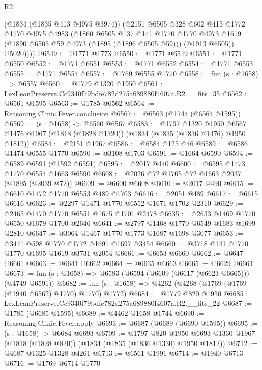 \begin{lexlean}{R2}
\begin{coremodule}
          (@1834 (@1835 @413 @4975 @3974))
          (@2151
            @6505
            @328
            @602
            @415
            @1772
            @1770
            @4975
            @4983
            (@1860
              @6505
              @137
              @141
              @1770
              @1770
              @4973
              @1619
              (@1890 @6505 @59 @4973 (@1895 (@1896 @6505 @59)))
              (@1913 @6505))
            @5020))))
@6549 := @1771 @1773
@6550 := @1771 @6549
@6551 := @1771 @6550
@6552 := @1771 @6551
@6553 := @1771 @6552
@6554 := @1771 @6553
@6555 := @1771 @6554
@6557 := @1769 @6555 @1770
@6558 := fun (s : @1658) => @6557
@6560 := @1779 @1320 @1950
@6561 := LexLeanPreserve.Cc9340f79bdfe782d275a689880f4607a.R2.__fits_35
@6562 := @6561 @1595
@6563 := @1785 @6562
@6564 := Reasoning.Clinic.Fever.conclusion
@6567 := @6563 (@1744 (@6564 @1595))
@6569 := (s : @1658) -> @6560 @6567
@6583 := @1797
    @1320
    @1950
    @6567
    @1476
    @1967
    (@1818 (@1828 @1320))
    (@1834 (@1835 (@1836 @1476) @1950 @1812))
@6584 := @2151 @1967
@6586 := @6584 @125 @46
@6589 := @6586 @1474 @6555 @1770
@6590 := @3108 @1703
@6591 := @1664 @6590
@6594 := @6589 @6591 (@1592 @6591)
@6595 := @2017 @440
@6600 := @6595 @1473 @1770 @6554 @1663 @6590
@6608 := @2026 @72 @1705 @72 @1663 @2037 (@1895 (@2039 @72))
@6609 := @6600 @6608
@6610 := @2017 @490
@6615 := @6610 @1472 @1770 @6553 @489 @1703
@6616 := @2051 @489
@6617 := @6615 @6616
@6623 := @2297 @1471 @1770 @6552 @1671 @1702 @2310
@6629 := @2465 @1470 @1770 @6551 @1675 @1701 @2478
@6635 := @2633 @1469 @1770 @6550 @1679 @1700 @2646
@6641 := @2797 @1468 @1770 @6549 @1683 @1699 @2810
@6647 := @3064 @1467 @1770 @1773 @1687 @1698 @3077
@6653 := @3441 @598 @1770 @1772 @1691 @1697 @3454
@6660 := @3718 @141 @1770 @1770 @1695 @1619 @3731 @2054
@6661 := @6653 @6660
@6662 := @6647 @6661
@6663 := @6641 @6662
@6664 := @6635 @6663
@6665 := @6629 @6664
@6673 := fun (s : @1658) => @6583 (@6594 (@6609 (@6617 (@6623 @6665))) (@4749 @6591))
@6682 := fun (s : @1658) => @4262 (@4268 (@1769 (@1769 (@1940 @6562) @1770) @1770) @1772)
@6684 := @1779 @820 @1950
@6685 := LexLeanPreserve.Cc9340f79bdfe782d275a689880f4607a.R2.__fits_22
@6687 := @1785 (@6685 @1595)
@6689 := @4462 @1658 @1744
@6690 := Reasoning.Clinic.Fever.apply
@6693 := @6687 (@6689 (@6690 @1595))
@6695 := (s : @1658) -> @6684 @6693
@6709 := @1797
    @820
    @1950
    @6693
    @1330
    @1967
    (@1818 (@1828 @820))
    (@1834 (@1835 (@1836 @1330) @1950 @1812))
@6712 := @4687 @1325 @1328 @4261
@6713 := @6561 @1991
@6714 := @1940 @6713
@6716 := @1769 @6714 @1770

\end{coremodule}
\end{lexlean}

